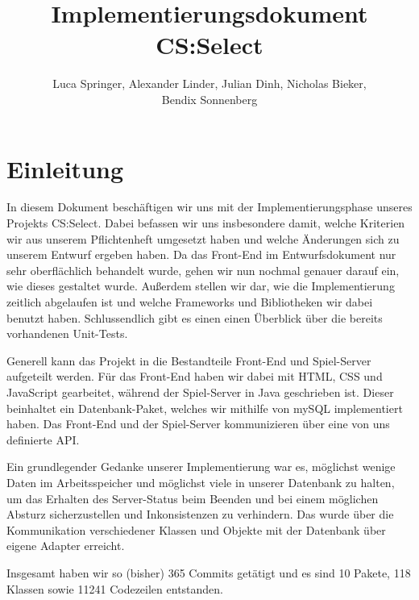 \documentclass[a4paper]{scrreprt}
\begin{document}
\title{Implementierungsdokument CS:Select}
\author{Luca Springer, Alexander Linder, Julian Dinh, Nicholas Bieker,\\ Bendix Sonnenberg}
\maketitle

\tableofcontents


\chapter{Einleitung}

In diesem Dokument beschäftigen wir uns mit der Implementierungsphase unseres Projekts CS:Select. Dabei befassen wir uns insbesondere damit, welche Kriterien wir aus unserem Pflichtenheft umgesetzt haben und welche Änderungen sich zu unserem Entwurf ergeben haben. Da das Front-End im Entwurfsdokument nur sehr oberflächlich behandelt wurde, gehen wir nun nochmal genauer darauf ein, wie dieses gestaltet wurde. Außerdem stellen wir dar, wie die Implementierung zeitlich abgelaufen ist und welche Frameworks und Bibliotheken wir dabei benutzt haben. Schlussendlich gibt es einen einen Überblick über die bereits vorhandenen Unit-Tests.

\hspace{1cm}

Generell kann das Projekt in die Bestandteile Front-End und Spiel-Server aufgeteilt werden. Für das Front-End haben wir dabei mit HTML, CSS und JavaScript gearbeitet, während der Spiel-Server in Java geschrieben ist. Dieser beinhaltet ein Datenbank-Paket, welches wir mithilfe von mySQL implementiert haben. Das Front-End und der Spiel-Server kommunizieren über eine von uns definierte API.

\hspace{1cm}

Ein grundlegender Gedanke unserer Implementierung war es, möglichst wenige Daten im Arbeitsspeicher und möglichst viele in unserer Datenbank zu halten, um das Erhalten des Server-Status beim Beenden und bei einem möglichen Absturz sicherzustellen und Inkonsistenzen zu verhindern. Das wurde über die Kommunikation verschiedener Klassen und Objekte mit der Datenbank über eigene Adapter erreicht. 

\hspace{1cm}

Insgesamt haben wir so (bisher) 365 Commits getätigt und es sind 10 Pakete, 118 Klassen sowie 11241 Codezeilen entstanden. %
\end{document}
